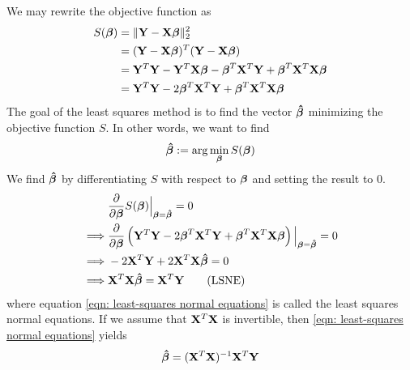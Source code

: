 We may rewrite the objective function as
\begin{align*}
    S(\boldsymbol{\beta})
     & = \| \mathbf{Y}-\mathbf{X} \boldsymbol{\beta} \|_2^2                                          \\
     & = (\mathbf{Y} - \mathbf{X} \boldsymbol{\beta})^{T} (\mathbf{Y} - \mathbf{X} \boldsymbol{\beta})                             \\
     & = \mathbf{Y}^T \mathbf{Y} - \mathbf{Y}^T \mathbf{X} \boldsymbol{\beta} - \boldsymbol{\beta}^T \mathbf{X}^T \mathbf{Y} + \boldsymbol{\beta}^T \mathbf{X}^T \mathbf{X} \boldsymbol{\beta} \\
     & = \mathbf{Y}^T \mathbf{Y} - 2 \boldsymbol{\beta}^T \mathbf{X}^T \mathbf{Y} + \boldsymbol{\beta}^T \mathbf{X}^T \mathbf{X} \boldsymbol{\beta}              \\
\end{align*}
The goal of the least squares method is to find the vector $\boldsymbol{\hat{\beta}}$ minimizing the objective function \( S \). In other words, we want to find
\[
    \boldsymbol{\hat{\beta}} := \arg \min_{\boldsymbol{\beta}} S(\boldsymbol{\beta})
\]
We find \( \boldsymbol{\hat{\beta}} \) by differentiating \( S \) with respect to $\boldsymbol{\beta}$ and setting the result to 0.
\begin{align}
             & \frac{\partial}{\partial \boldsymbol{\beta}} S(\boldsymbol{\beta}) \Big|_{\boldsymbol{\beta} = \boldsymbol{\hat{\beta}}} = 0 \nonumber                                                        \\
    \implies & \frac{\partial}{\partial \boldsymbol{\beta}} \left( \mathbf{Y}^T \mathbf{Y} - 2 \boldsymbol{\beta}^T \mathbf{X}^T \mathbf{Y} + \boldsymbol{\beta}^T \mathbf{X}^T \mathbf{X} \boldsymbol{\beta} \right)\Big|_{\boldsymbol{\beta} = \boldsymbol{\hat{\beta}}} = 0 \nonumber \\
    \implies & - 2 \mathbf{X}^T \mathbf{Y} + 2 \mathbf{X}^T \mathbf{X} \boldsymbol{\hat{\beta}} = 0 \nonumber                                                                                      \\
    \implies & \mathbf{X}^T \mathbf{X} \boldsymbol{\hat{\beta}} = \mathbf{X}^T \mathbf{Y} \label{eqn: least-squares normal equations} \tag{LSNE}
\end{align}
where equation \eqref{eqn: least-squares normal equations} is called the least squares normal equations. If we assume that \( \mathbf{X}^T \mathbf{X} \) is invertible, then \eqref{eqn: least-squares normal equations} yields
\begin{equation}
    \label{eqn: least squares estimator}
    \boldsymbol{\hat{\beta}} = (\mathbf{X}^T \mathbf{X})^{-1} \mathbf{X}^T \mathbf{Y}
\end{equation}

